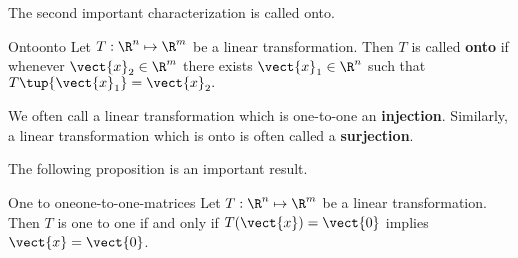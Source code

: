The second important characterization is called onto.

\begin{definition}{Onto}{onto}
Let $T: \R^n \mapsto \R^m$ be a linear transformation. Then $T$ is called \textbf{onto} if whenever $\vect{x}_2 \in \R^{m}$ there exists 
$\vect{x}_1 \in \R^{n}$ such that $T\tup{\vect{x}_1} = \vect{x}_2. $
\end{definition}

We often call a linear transformation which is one-to-one an \textbf{injection}. Similarly, a linear transformation which is onto is often called a \textbf{surjection}.

The following proposition is an important result. 

\begin{proposition}{One to one}{one-to-one-matrices}
Let $T:\R^n \mapsto \R^m$ be a linear transformation. Then $T$ is one to one if
and only if $T(\vect{x}) = \vect{0}$ implies $\vect{x}=\vect{0}$.
\end{proposition}

